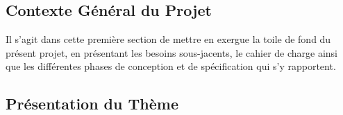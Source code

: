 


\begin{center}
\chapter{Contexte Général du Projet}
\end{center}

Il s'agit dans cette première section de mettre en exergue la toile de fond du présent projet, en présentant les besoins sous-jacents, le cahier de charge ainsi que les différentes phases de conception et de spécification qui s'y rapportent.
\vspace{1cm}
\section{Présentation du Thème}
\vspace{.5cm}

